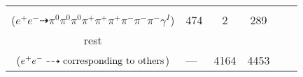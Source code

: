 \documentclass[landscape]{article}
\newcounter{rownumbers}
\newcommand\rn{\stepcounter{rownumbers}\arabic{rownumbers}}
\newcommand{\EOL}{\\} %
\newcommand{\topoTags}[1]{#1} %
\begin{document}
\begin{longtable}{clcccc}
\rn & \makecell[l]{ $ 
e^{+} e^{-} \rightarrow \pi^{0} \pi^{0} \pi^{+} \pi^{+} \pi^{+} \pi^{-} \pi^{-} \rho^{-} \gamma^{I} ,
\rho^{-} \rightarrow \pi^{0} \pi^{-} 
$ \\ ($
e^{+} e^{-} \dashrightarrow \pi^{0} \pi^{0} \pi^{0} \pi^{+} \pi^{+} \pi^{+} \pi^{-} \pi^{-} \pi^{-} \gamma^{I} 
$) } & \topoTags{474 & }2 & 289 \EOL

rest & \makecell[l]{ $ 
e^{+} e^{-} \rightarrow \rm{others \  (3956 \  in \  total)}
$ \\ ($
e^{+} e^{-} \dashrightarrow \rm{corresponding\ to\ others}
$) } & \topoTags{--- & }4164 & 4453 \\ \hline

\end{longtable}
\end{document}
